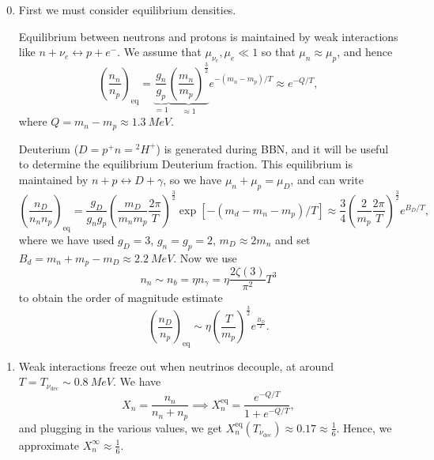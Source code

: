 \documentclass{jknotes}
\begin{document}
\begin{enumerate}
    \setcounter{enumi}{-1}
    \item First we must consider equilibrium densities.

        Equilibrium between neutrons and protons is maintained by weak interactions like \(n+\nu_e \leftrightarrow p + e^-\). We assume that \(\mu_{\nu_e},\mu_e \ll 1\) so that \(\mu_n \approx \mu_p\), and hence 
        \begin{equation}
            \left(\frac{n_n}{n_p}\right)_{\text{eq}} = \underbrace{\frac{g_n}{g_p}}_{=1}\underbrace{\left(\frac{m_n}{m_p}\right)^{\frac32}}_{\approx 1} e^{-(m_n-m_p)/T} \approx e^{-Q/T},
        \end{equation}
        where \(Q = m_n-m_p \approx \SI{1.3}{MeV}\).

        Deuterium (\(D=p^+n={}^2H^+\)) is generated during BBN, and it will be useful to determine the equilibrium Deuterium fraction. This equilibrium is maintained by \(n+p\leftrightarrow D+\gamma\), so we have \(\mu_n+\mu_p=\mu_D\), and can write
        \begin{equation}
            \left(\frac{n_D}{n_nn_p}\right)_{\text{eq}} = \frac{g_D}{g_ng_p}\left(\frac{m_D}{m_nm_p}\frac{2\pi}{T}\right)^{\frac32}\exp[-(m_d-m_n-m_p)/T] \approx \frac34\left(\frac2{m_p}\frac{2\pi}T\right)^{\frac32}e^{B_D/T},
        \end{equation}
        where we have used \(g_D=3\), \(g_n=g_p=2\), \(m_D\approx 2m_n\) and set \(B_d = m_n+m_p - m_D \approx \SI{2.2}{MeV}\). Now we use
        \begin{equation}
            n_n \sim n_b = \eta n_\gamma = \eta \frac{2\zeta(3)}{\pi^2}T^3
        \end{equation}
        to obtain the order of magnitude estimate
        \begin{equation}
            \left(\frac{n_D}{n_p}\right)_{\text{eq}} \sim \eta \left(\frac{T}{m_p}\right)^{\frac32} e^{\frac{B_D}{T}}.
        \end{equation}
    \item Weak interactions freeze out when neutrinos decouple, at around \(T = T_{\nu_{\text{dec}}}\sim \SI{0.8}{MeV}\). We have
        \begin{equation}
            X_n = \frac{n_n}{n_n+n_p} \implies X_n^{\text{eq}} = \frac{e^{-Q/T}}{1 + e^{-Q/T}},
        \end{equation}
        and plugging in the various values, we get \(X_n^{\text{eq}}(T_{\nu_{\text{dec}}}) \approx 0.17 \approx \frac16\). Hence, we approximate \(X_n^\infty \approx \frac16\).

\end{enumerate}
\end{document}

